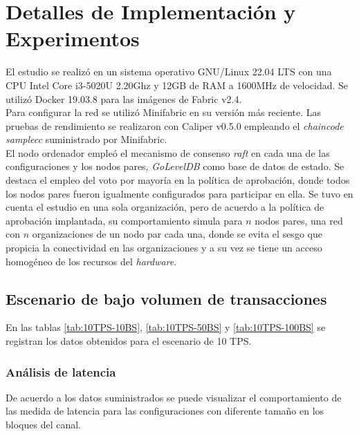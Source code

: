 \chapter{Detalles de Implementación y Experimentos}\label{chapter:implementation}

El estudio se realiz\'o en un sistema operativo GNU/Linux 22.04 LTS con una CPU Intel Core i3-5020U 2.20Ghz y 12GB de RAM a 1600MHz de velocidad. Se utiliz\'o Docker 19.03.8 para las im\'agenes de Fabric v2.4.\\

Para configurar la red se utiliz\'o Minifabric en su versi\'on m\'as reciente. Las pruebas de rendimiento se realizaron con Caliper v0.5.0 empleando el \emph{chaincode} \emph{samplecc} suministrado por Minifabric.\\

El nodo ordenador emple\'o el mecanismo de consenso \emph{raft} en cada una de las configuraciones y los nodos pares, \emph{GoLevelDB} como base de datos de estado. Se destaca el empleo del voto por mayor\'ia en la pol\'itica de aprobaci\'on, donde todos los nodos pares fueron igualmente configurados para participar en ella. Se tuvo en cuenta el estudio en una sola organizaci\'on, pero de acuerdo a la pol\'itica de aprobaci\'on implantada, su comportamiento simula para $n$ nodos pares, una red con $n$ organizaciones de un nodo par cada una, donde se evita el sesgo que propicia la conectividad en las organizaciones y a su vez se tiene un acceso homog\'eneo de los recursos del \emph{hardware}.

\newpage
\section{Escenario de bajo volumen de transacciones}

En las tablas \ref{tab:10TPS-10BS}, \ref{tab:10TPS-50BS} y \ref{tab:10TPS-100BS} se registran los datos obtenidos para el escenario de 10 TPS.\\

\subsection{An\'alisis de latencia}
De acuerdo a los datos suministrados se puede visualizar el comportamiento de las medida de latencia para las configuraciones con diferente tama\~no en los bloques del canal.\\

